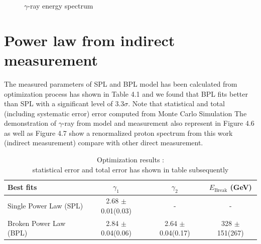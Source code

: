 \begin{figure}[h!]
    \caption{$\gamma$-ray energy spectrum}
\end{figure}


\clearpage
\section{Power law from indirect measurement}
The measured parameters of SPL and BPL model has been calculated from optimization process has shown in Table 4.1 and we found that BPL fits better than SPL with a significant level of $3.3\sigma$. 
Note that statistical and total (including systematic error) error computed from Monte Carlo Simulation
The demonstration of $\gamma$-ray from model and measurement also represent in Figure 4.6 as well as Figure 4.7 show a renormalized proton spectrum from this work (indirect measurement) compare with other direct measurement.
\begin{table}[h!]
    \begin{tabular}{l | c | c | c}
      Best fits & $\gamma_1$ & $\gamma_2$ & $E_{\text{Break}}$ (GeV) \\
      \hline \hline
      Single Power Law (SPL) & 2.68 $\pm$ 0.01(0.03) & - & -  \\
      Broken Power Law (BPL) & 2.84 $\pm$ 0.04(0.06) & 2.64 $\pm$ 0.04(0.17) & 328 $\pm$ 151(267)
    \end{tabular}
    \caption{Optimization results : \\ statistical error and total error has shown in table subsequently}
\end{table}

